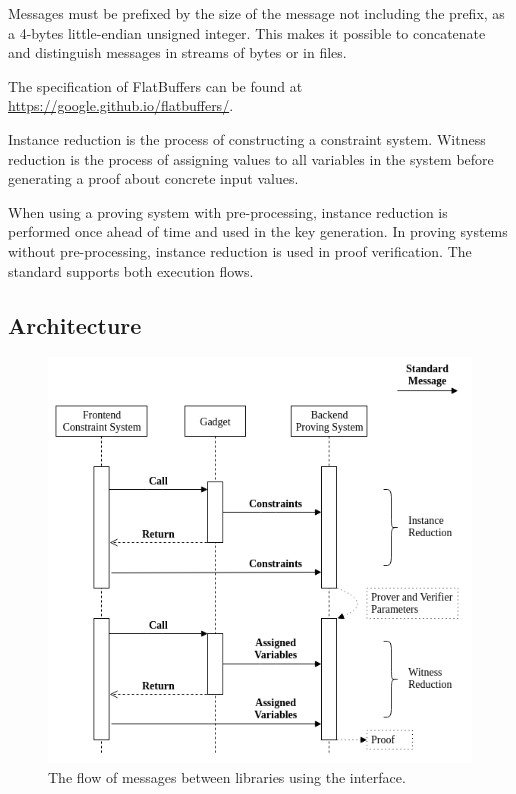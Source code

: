 	Messages must be prefixed by the size of the message not including the prefix,
	as a 4-bytes little-endian unsigned integer.
	This makes it possible to concatenate and distinguish messages
	in streams of bytes or in files.

	The specification of FlatBuffers can be found at
	\href{https://google.github.io/flatbuffers/}{https://google.github.io/flatbuffers/}.



	Instance reduction is the process of constructing a constraint system.
	Witness reduction is the process of assigning values to all variables
	in the system before generating a proof about concrete input values.

	When using a proving system with pre-processing, instance reduction
	is performed once ahead of time and used in the key generation.
	In proving systems without pre-processing, instance reduction is used in proof verification.
	The standard supports both execution flows.


\subsection{Architecture}
\label{sec:architecture}

\begin{figure}[!h]
	\centering
	\includegraphics[width=\linewidth]{graphics/call_flow.png}
	\caption{The flow of messages between libraries using the interface.}
	\label{fig:flow}
\end{figure}

